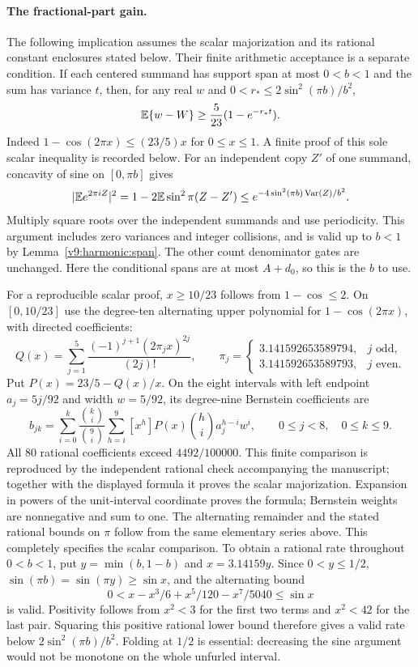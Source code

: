 \paragraph{The fractional-part gain.}
The following implication assumes the scalar majorization and its rational
constant enclosures stated below. Their finite arithmetic acceptance is a
separate condition.
If each centered summand has support span at most $0<b<1$ and the sum has
variance $t$, then, for any real $w$ and
$0<r_*\le2\sin^2(\pi b)/b^2$,
\begin{equation}\label{ms:fourier:cut49:shortloc:harmonic}
             \mathbb E\{w-W\}\ge\frac5{23}(1-e^{-r_*t}).
\end{equation}
Indeed $1-\cos(2\pi x)\le(23/5)x$ for $0\le x\le1$.
A finite proof of this sole scalar inequality is recorded below.
For an independent copy $Z'$ of one summand, concavity of sine on
$[0,\pi b]$ gives
\[
 |\mathbb E e^{2\pi iZ}|^2
 =1-2\mathbb E\sin^2\pi(Z-Z')
 \le e^{-4\sin^2(\pi b)\operatorname{Var}(Z)/b^2}.
\]
Multiply square roots over the independent summands and use periodicity.
This argument includes zero variances and integer collisions, and is
valid up to $b<1$ by Lemma~\ref{v9:harmonic:span}. The other count
denominator gates are unchanged.
Here the conditional spans are at most $A+d_0$, so this is the $b$ to use.

For a reproducible scalar proof, $x\ge10/23$ follows from $1-\cos\le2$.
On $[0,10/23]$ use the degree-ten alternating upper polynomial for
$1-\cos(2\pi x)$, with directed coefficients:
\[
 Q(x)=\sum_{j=1}^5\frac{(-1)^{j+1}(2\pi_jx)^{2j}}{(2j)!},\qquad
 \pi_j=\begin{cases}3.141592653589794,&j\text{ odd},\\
                       3.141592653589793,&j\text{ even}.\end{cases}
\]
Put
$P(x)=23/5-Q(x)/x$. On the eight intervals with left endpoint $a_j=5j/92$
and width $w=5/92$, its degree-nine Bernstein coefficients are
\[
 b_{jk}=\sum_{i=0}^k\frac{\binom ki}{\binom9i}
           \sum_{h=i}^9[x^h]P(x)\binom hi a_j^{h-i}w^i,
 \qquad 0\le j<8,\quad0\le k\le9.
\]
All 80 rational coefficients exceed $4492/100000$. This finite
comparison is reproduced by the independent rational check accompanying
the manuscript; together with the displayed formula it proves the scalar
majorization. Expansion in powers of the unit-interval coordinate
proves the formula; Bernstein weights are nonnegative and sum to one.
The alternating remainder and the stated rational bounds on $\pi$ follow
from the same elementary series above. This completely specifies the
scalar comparison. To obtain a rational rate throughout $0<b<1$, put
$y=\min(b,1-b)$ and $x=3.14159y$. Since $0<y\le1/2$,
$\sin(\pi b)=\sin(\pi y)\ge\sin x$, and the alternating bound
\[
 0<x-x^3/6+x^5/120-x^7/5040\le\sin x
\]
is valid. Positivity follows from $x^2<3$ for the first two terms
and $x^2<42$ for the last pair. Squaring this positive rational lower
bound therefore gives a valid rate below $2\sin^2(\pi b)/b^2$.
Folding at $1/2$ is essential: decreasing the sine argument would not be
monotone on the whole unfurled interval.

